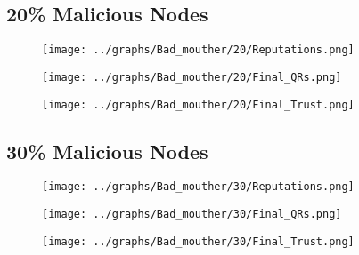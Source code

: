 \documentclass{article}
\begin{document}
  \begin{minipage}[t]{0.49\columnwidth}
    \subsection*{20\% Malicious Nodes}
        \begin{figure}[H]
            \centering
            \texttt{[image: ../graphs/Bad\_mouther/20/Reputations.png]}
        \end{figure}
        \begin{figure}[H]
            \centering
            \texttt{[image: ../graphs/Bad\_mouther/20/Final\_QRs.png]}
        \end{figure}
    \end{minipage}
    \begin{minipage}[t]{0.49\columnwidth}
        \begin{figure}[H]
            \centering
            \texttt{[image: ../graphs/Bad\_mouther/20/Final\_Trust.png]}
        \end{figure}
    \end{minipage}

  \begin{minipage}[t]{0.49\columnwidth}
    \subsection*{30\% Malicious Nodes}
        \begin{figure}[H]
            \centering
            \texttt{[image: ../graphs/Bad\_mouther/30/Reputations.png]}
        \end{figure}
        \begin{figure}[H]
            \centering
            \texttt{[image: ../graphs/Bad\_mouther/30/Final\_QRs.png]}
        \end{figure}
    \end{minipage}
    \begin{minipage}[t]{0.49\columnwidth}
        \begin{figure}[H]
            \centering
            \texttt{[image: ../graphs/Bad\_mouther/30/Final\_Trust.png]}
        \end{figure}
    \end{minipage}
\end{document}
